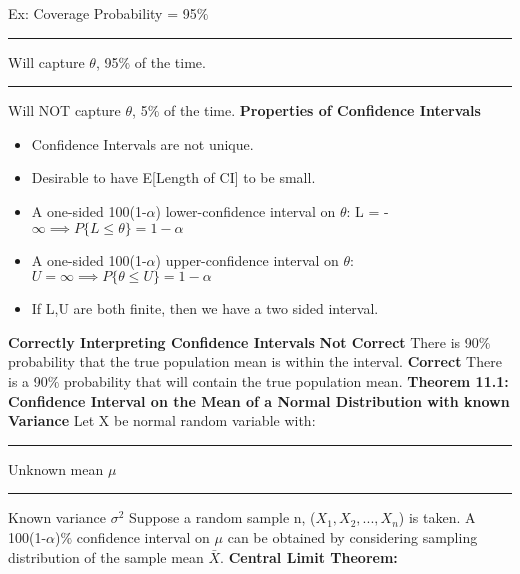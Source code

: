 \documentclass[]{article}
\begin{document}
\newline
\newline Ex: Coverage Probability = 95$\%$
\newline\Large\rule{1.3cm}{0pt} Will capture $\theta$, 95$\%$ of the time.
\newline\Large\rule{1.3cm}{0pt} Will NOT capture $\theta$, 5$\%$ of the time.
\newline
\newline\Large\textbf{Properties of Confidence Intervals}
\begin{itemize}
	\item Confidence Intervals are not unique.
	\item Desirable to have E[Length of CI] to be small.
	\item A one-sided 100(1-$\alpha$) lower-confidence interval on $\theta$:  L = -$\infty  \implies P\{ L \le \theta \} = 1-\alpha$
	\item A one-sided 100(1-$\alpha$) upper-confidence interval on $\theta$: $U = \infty  \implies P\{ \theta \le U \} = 1-\alpha$
	\item If L,U are both finite, then we have a two sided interval.
\end{itemize}
\Large\textbf{Correctly Interpreting Confidence Intervals}
\newline \textbf{Not Correct}
\newline There is 90$\%$ probability that the true population mean is within the interval.
\newline \textbf{Correct}
\newline There is a 90$\%$ probability that  will contain the true population mean.
\newline
\newline
\Large\textbf{Theorem 11.1: Confidence Interval on the Mean of a Normal Distribution with known Variance}
\newline Let X be normal random variable with:
\newline\Large\rule{1.3cm}{0pt} Unknown mean $\mu$
\newline\Large\rule{1.3cm}{0pt} Known variance $\sigma ^2$
\newline Suppose a random sample n, ($X_1, X_2,...,X_n$) is taken.
\newline A 100(1-$\alpha$)$\%$ confidence interval on $\mu$ can be obtained by considering sampling distribution of the sample mean $\bar{X}$.
\newline
\newline\textbf{Central Limit Theorem:} 
\end{document}

